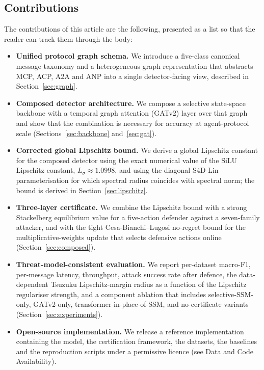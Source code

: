 \documentclass{ieeeaccess}
\begin{document}
\subsection{Contributions}
\label{sec:contributions}
The contributions of this article are the following, presented as a list so that the reader can track them through the body:
\begin{itemize}
\item \textbf{Unified protocol graph schema.} We introduce a five-class canonical message taxonomy and a heterogeneous graph representation that abstracts MCP, ACP, A2A and ANP into a single detector-facing view, described in Section~\ref{sec:graph}.
\item \textbf{Composed detector architecture.} We compose a selective state-space backbone with a temporal graph attention (GATv2) layer over that graph and show that the combination is necessary for accuracy at agent-protocol scale (Sections~\ref{sec:backbone} and~\ref{sec:gat}).
\item \textbf{Corrected global Lipschitz bound.} We derive a global Lipschitz constant for the composed detector using the exact numerical value of the SiLU Lipschitz constant, $L_{\sigma}\approx 1.0998$, and using the diagonal S4D-Lin parameterisation for which spectral radius coincides with spectral norm; the bound is derived in Section~\ref{sec:lipschitz}.
\item \textbf{Three-layer certificate.} We combine the Lipschitz bound with a strong Stackelberg equilibrium value for a five-action defender against a seven-family attacker, and with the tight Cesa-Bianchi--Lugosi no-regret bound for the multiplicative-weights update that selects defensive actions online (Section~\ref{sec:composed}).
\item \textbf{Threat-model-consistent evaluation.} We report per-dataset macro-F1, per-message latency, throughput, attack success rate after defence, the data-dependent Tsuzuku Lipschitz-margin radius as a function of the Lipschitz regulariser strength, and a component ablation that includes selective-SSM-only, GATv2-only, transformer-in-place-of-SSM, and no-certificate variants (Section~\ref{sec:experiments}).
\item \textbf{Open-source implementation.} We release a reference implementation containing the model, the certification framework, the datasets, the baselines and the reproduction scripts under a permissive licence (see Data and Code Availability).
\end{itemize}
\end{document}
